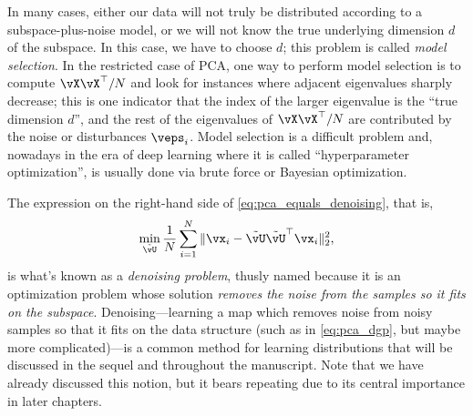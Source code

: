 \documentclass[../../book-main.tex]{subfiles}
\begin{document}
\begin{remark}
    In many cases, either our data will not truly be distributed according to a subspace-plus-noise model, or we will not know the true underlying dimension \(d\) of the subspace. In this case, we have to choose \(d\); this problem is called \textit{model selection}. In the restricted case of PCA, one way to perform model selection is to compute \(\vX\vX^{\top}/N\) and look for instances where adjacent eigenvalues sharply decrease; this is one indicator that the index of the larger eigenvalue is the ``true dimension \(d\)'', and the rest of the eigenvalues of \(\vX\vX^{\top}/N\) are contributed by the noise or disturbances \(\veps_{i}\). Model selection is a difficult problem and, nowadays in the era of deep learning where it is called ``hyperparameter optimization'', is usually done via brute force or Bayesian optimization. %
\end{remark}

\begin{remark}
    The expression on the right-hand side of \eqref{eq:pca_equals_denoising}, that is,
    \begin{equation}\label{eq:orthogonal_denoising}
        \min_{\tilde{\vU}}\frac{1}{N}\sum_{i = 1}^{N}\norm{\vx_{i} - \tilde{\vU}\tilde{\vU}^{\top}\vx_{i}}_{2}^{2},
    \end{equation}
    is what's known as a \textit{denoising problem}, thusly named because it is an optimization problem whose solution \textit{removes the noise from the samples so it fits on the subspace}. Denoising---learning a map which removes noise from noisy samples so that it fits on the data structure (such as in \eqref{eq:pca_dgp}, but maybe more complicated)---is a common method for learning distributions that will be discussed in the sequel and throughout the manuscript. Note that we have already discussed this notion, but it bears repeating due to its central importance in later chapters.
\end{remark}
\end{document}
